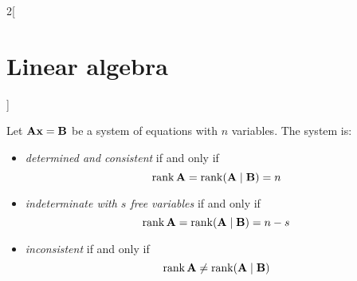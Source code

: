\documentclass[../../../main.tex]{subfiles}
\begin{document}
\begin{multicols}{2}[\section{Linear algebra}]
  \begin{theorem}
    Let $\vb{A}\vb{x}=\vb{B}$ be a system of equations with $n$ variables. The system is:
    \begin{itemize}
      \item \textit{determined and consistent} if and only if $$\rank \vb{A}=\rank (\vb{A}\mid \vb{B})=n$$
      \item \textit{indeterminate with $s$ free variables} if and only if $$\rank \vb{A}=\rank (\vb{A}\mid \vb{B})=n-s$$
      \item \textit{inconsistent} if and only if $$\rank \vb{A}\ne\rank (\vb{A}\mid \vb{B})$$
    \end{itemize}
  \end{theorem}

\end{multicols}
\end{document}
